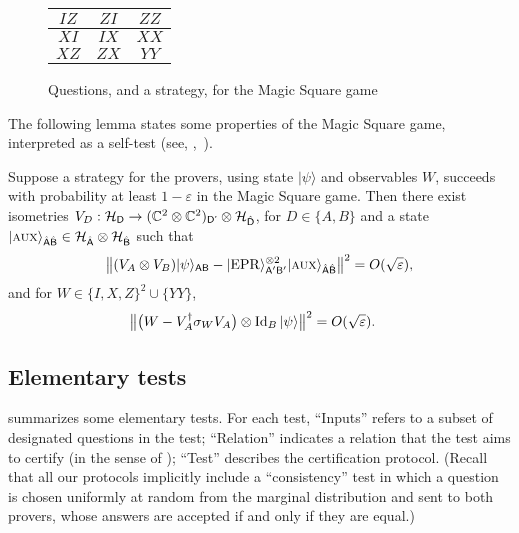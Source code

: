 \documentclass{toc}
\newcommand{\ket}[1]{|#1\rangle}
\newcommand{\Id}{\ensuremath{\mathop{\rm Id}\nolimits}}
\newcommand{\reg}[1]{{\textsf{#1}}}
\newcommand{\mH}{\mathcal{H}}
\newcommand{\eps}{\varepsilon}
\newcommand{\EPR}{{\rm EPR}}
\newcommand{\aux}{\textsc {aux}}
\begin{document}
\begin{figure}[H]
\begin{center}
\begin{tabular}{|c|c|c|}
\hline
$IZ$ & $ZI$ & $ZZ$ \\
\hline
$XI$ & $IX$ & $XX$ \\
\hline
$XZ$ & $ZX$ & $YY$\\
\hline
\end{tabular}
\end{center}
\caption{Questions, and a strategy, for the Magic Square game}
\label{fig:ms}
\end{figure}

The following lemma states some properties of the Magic Square game, interpreted as a self-test (see, %
 \eg,~\cite{WBMS16}). 

\begin{lemma}\label{lem:ms-rigid}
Suppose a strategy for the provers, using state $\ket{\psi}$ and observables $W$, succeeds with probability at least $1-\eps$ in the Magic Square game. Then there exist  isometries $V_D:\mH_\reg{D} \to (\C^2\otimes \C^2)_{\reg{D'}}\otimes {\mH}_{\hat{\reg{D}}}$, for $D\in\{A,B\}$ and a state $\ket{\aux}_{\hat{\reg{A}}\hat{\reg{B}}} \in {\mH}_{\hat{\reg{A}}}\otimes {\mH}_{\hat{\reg{B}}}$ such that
$$\big\| (V_A \otimes V_B) \ket{\psi}_{\reg{AB}} - \ket{\EPR}_{\reg{A}'\reg{B}'}^{\otimes 2} \ket{\aux}_{\hat{\reg{A}}\hat{\reg{B}}} \big\|^2 = O(\sqrt{\eps}),$$
and for $W\in \{I,X,Z\}^2 \cup \{YY\}$,
\begin{align*}
\big\| \big(W -V_A^\dagger \sigma_W V_A\big) \otimes \Id_B \ket{\psi} \big\|^2 &= O(\sqrt{\eps}).
\end{align*}
\end{lemma}





\subsection{Elementary tests}
\label{sec:elementary}



 summarizes some elementary tests. For each test, ``Inputs'' refers to a subset of designated questions in the test; ``Relation'' indicates a relation that the test aims to certify (in the sense of ); ``Test'' describes the certification protocol. (Recall that all our protocols implicitly include a ``consistency'' test in which a question is chosen uniformly at random from the marginal distribution and sent to both provers, whose answers are accepted if and only if they are equal.)
\end{document}
